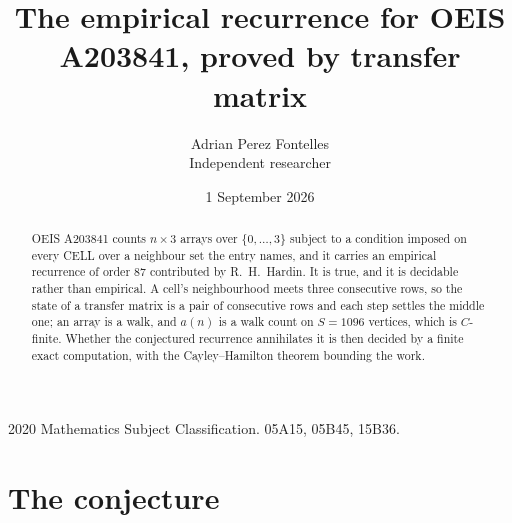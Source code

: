 \documentclass[11pt,a4paper]{article}
\title{The empirical recurrence for OEIS A203841, proved by transfer matrix}
\author{Adrian Perez Fontelles\\ \small Independent researcher}
\date{1 September 2026}
\theoremstyle{plain}
\theoremstyle{definition}
\begin{document}
\maketitle

\begin{abstract}
OEIS A203841 counts $n\times3$ arrays over $\{0,\dots,3\}$ subject to a condition imposed on
every CELL over a neighbour set the entry names, and it carries an empirical recurrence of
order $87$ contributed by R.~H.~Hardin. It is true, and it is decidable rather than
empirical. A cell's neighbourhood meets three consecutive rows, so the state of a transfer
matrix is a pair of consecutive rows and each step settles the middle one; an array is a
walk, and $a(n)$ is a walk count on $S=1096$ vertices, which is $C$-finite. Whether the
conjectured recurrence annihilates it is then decided by a finite exact computation, with the
Cayley--Hamilton theorem bounding the work.
\end{abstract}

\noindent\small 2020 Mathematics Subject Classification. 05A15, 05B45, 15B36.\normalsize

\section{The conjecture}
\end{document}
